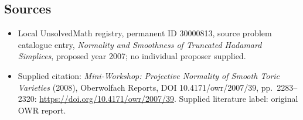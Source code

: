 \documentclass[11pt]{article}
\begin{document}
\subsection{Sources}
\begin{itemize}\item Local UnsolvedMath registry, permanent ID 30000813, source problem catalogue entry, \emph{Normality and Smoothness of Truncated Hadamard Simplices}, proposed year 2007; no individual proposer supplied.\item Supplied citation: \emph{Mini-Workshop: Projective Normality of Smooth Toric Varieties} (2008), Oberwolfach Reports, DOI 10.4171/owr/2007/39, pp.\ 2283--2320: \url{https://doi.org/10.4171/owr/2007/39}. Supplied literature label: original OWR report.\end{itemize}
\end{document}

